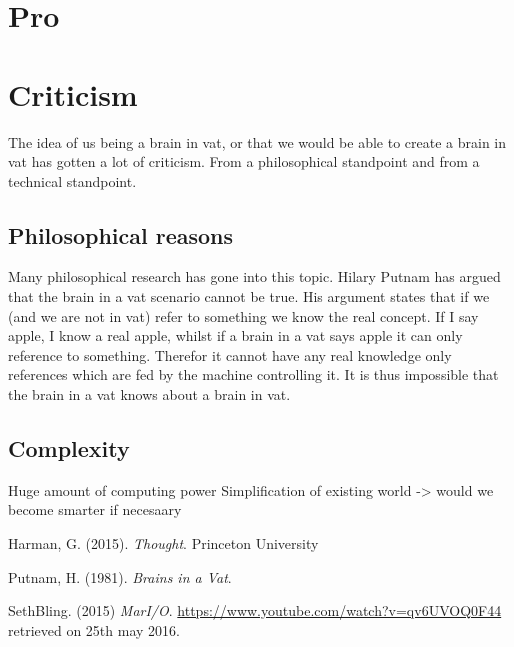 \documentclass[a4paper]{article}
\begin{document}
\section{Pro}

 
 
\section{Criticism}
The idea of us being a brain in vat, or that we would be able to create a brain in vat has gotten a lot of criticism. From a philosophical standpoint and from a technical standpoint.
\subsection{Philosophical reasons}
Many philosophical research has gone into this topic. Hilary Putnam has argued that the brain in a vat scenario cannot be true. His argument states that if we (and we are not in vat) refer to something we know the real concept. If I say apple, I know a real apple, whilst if a brain in a vat says apple it can only reference to something. Therefor it cannot have any real knowledge only references which are fed by the machine controlling it. It is thus impossible that the brain in a vat knows about a brain in vat.\\



\subsection{Complexity}
Huge amount of computing power
Simplification of existing world -> would we become smarter if necesaary

\begin{thebibliography}{9}

  Harman, G. (2015). \emph{Thought}. Princeton University 

  Putnam, H. (1981). \emph{Brains in a Vat}.
  
  SethBling. (2015) \emph{MarI/O}. \url{https://www.youtube.com/watch?v=qv6UVOQ0F44} retrieved on 25th may 2016.

\end{thebibliography}
\end{document}
